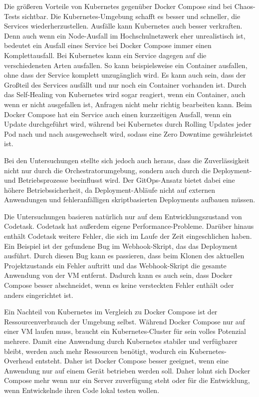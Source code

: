Die größeren Vorteile von Kubernetes gegenüber Docker Compose sind bei Chaos-Tests sichtbar.
Die Kubernetes-Umgebung schafft es besser und schneller, die Services wiederherzustellen. 
Ausfälle kann Kubernetes auch besser verkraften. Denn auch wenn ein Node-Ausfall im Hochschulnetzwerk eher unrealistisch ist, bedeutet ein Ausfall eines Service bei Docker Compose immer einen Komplettausfall. 
Bei Kubernetes kann ein Service dagegen auf die verschiedensten Arten ausfallen. So kann beispielsweise ein Container ausfallen, ohne dass der Service komplett unzugänglich wird. Es kann auch sein, dass der Großteil des Services ausfällt und nur noch ein Container vorhanden ist.
Durch das Self-Healing von Kubernetes wird sogar reagiert, wenn ein Container, auch wenn er nicht ausgefallen ist, Anfragen nicht mehr richtig bearbeiten kann.
Beim Docker Compose hat ein Service auch einen kurzzeitigen Ausfall, wenn ein Update durchgeführt wird, während bei Kubernetes durch Rolling Updates jeder Pod nach und nach ausgewechselt wird, sodass eine Zero Downtime gewährleistet ist.

Bei den Untersuchungen stellte sich jedoch auch heraus, dass die Zuverlässigkeit nicht nur durch die Orchestratorumgebung, sondern auch durch die Deployment- und Betriebsprozesse beeinflusst wird.
Der GitOps-Ansatz bietet dabei eine höhere Betriebssicherheit, da Deployment-Abläufe nicht auf externen Anwendungen und fehleranfälligen skriptbasierten Deployments aufbauen müssen.

Die Untersuchungen basieren natürlich nur auf dem Entwicklungszustand von Codetask. Codetask hat außerdem eigene Performance-Probleme.
Darüber hinaus enthält Codetask weitere Fehler, die sich im Laufe der Zeit eingeschlichen haben. 
Ein Beispiel ist der gefundene Bug im Webhook-Skript, das das Deployment ausführt.
Durch diesen Bug kann es passieren, dass beim Klonen des aktuellen Projektzustands ein Fehler auftritt und das Webhook-Skript die gesamte Anwendung von der VM entfernt.
Dadurch kann es auch sein, dass Docker Compose besser abschneidet, wenn es keine versteckten Fehler enthält oder anders eingerichtet ist.

Ein Nachteil von Kubernetes im Vergleich zu Docker Compose ist der Ressourcenverbrauch der Umgebung selbst.
Während Docker Compose nur auf einer VM laufen muss, braucht ein Kubernetes-Cluster für sein volles Potenzial mehrere.
Damit eine Anwendung durch Kubernetes stabiler und verfügbarer bleibt, werden auch mehr Ressourcen benötigt, wodurch ein Kubernetes-Overhead entsteht.
Daher ist Docker Compose besser geeignet, wenn eine Anwendung nur auf einem Gerät betrieben werden soll. Daher lohnt sich Docker Compose mehr wenn nur ein Server zuverfügung steht oder für die Entwicklung, wenn Entwickelnde ihren Code lokal testen wollen.

